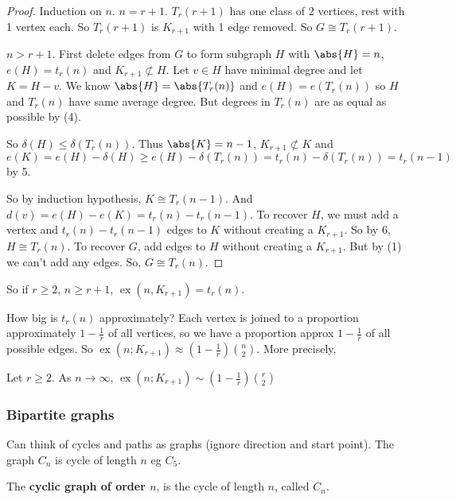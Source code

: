 \documentclass{article}
\DeclareMathOperator{\ext}{ex}
\begin{document}
\begin{proof}
    Induction on $n$.
    $n = r+1$. $T_r(r+1)$ has one class of 2 vertices, rest with 1 vertex each. So $T_r(r+1)$ is $K_{r+1}$ with 1 edge removed. So $G \cong T_r(r+1)$.

    $n > r+1$. First delete edges from $G$ to form subgraph $H$ with $\abs{H} = n$, $e(H) = t_r(n)$ and $K_{r+1} \not \subset H$. Let $v \in H$ have minimal degree and let $K = H- v$.
    We know $\abs{H} = \abs{T_r(n)}$ and $e(H) = e(T_r(n))$ so $H$ and $T_r(n)$ have same average degree. But degrees in $T_r(n)$ are as equal as possible by (4).

    So $\delta(H) \leq \delta(T_r(n))$. Thus $\abs{K} = n-1$, $K_{r+1} \not\subset K$ and $e(K) = e(H) - \delta (H) \geq e(H) - \delta(T_r(n)) = t_r(n) - \delta(T_r(n)) = t_r(n-1)$ by 5.

    So by induction hypothesis, $K \cong T_r(n-1)$. And $d(v) = e(H) - e(K) = t_r(n) - t_r(n-1)$.
    To recover $H$, we must add a vertex and $t_r(n) - t_r(n-1)$ edges to $K$ without creating a $K_{r+1}$. So by 6, $H \cong T_r(n)$.
    To recover $G$, add edges to $H$ without creating a $K_{r+1}$. But by (1) we can't add any edges. So, $G \cong T_r(n)$.
\end{proof}

So if $r \geq 2$, $n \geq r+1$, $\ext(n, K_{r+1}) = t_r(n)$.

How big is $t_r(n)$ approximately?
Each vertex is joined to a proportion approximately $1 - \frac{1}{r}$ of all vertices, so we have a proportion approx $1 - \frac{1}{r}$ of all possible edges. So $\ext(n; K_{r+1}) \approx (1-\frac{1}{r}) \binom{n}{2}$.
More precisely,

\begin{ncor}\label{cor:10}
    Let $r \geq 2$. As $n \to \infty$, $\ext(n; K_{r+1}) \sim (1 - \frac{1}{r}) \binom{r}{2}$
\end{ncor}

\subsubsection{Bipartite graphs}
Can think of cycles and paths as graphs (ignore direction and start point). The graph $C_n$ is cycle of length $n$ eg $C_5$.

\begin{defi}
    The \textbf{cyclic graph of order $n$}, is the cycle of length $n$, called $C_n$.
\end{defi}
\end{document}
